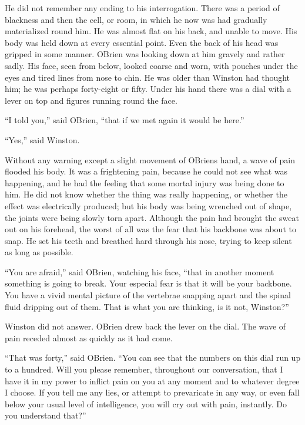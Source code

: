 He did not remember any ending to his interrogation. There was a period
of blackness and then the cell, or room, in which he now was had
gradually materialized round him. He was almost flat on his back, and
unable to move. His body was held down at every essential point. Even
the back of his head was gripped in some manner. O\textquotesingle Brien
was looking down at him gravely and rather sadly. His face, seen from
below, looked coarse and worn, with pouches under the eyes and tired
lines from nose to chin. He was older than Winston had thought him; he
was perhaps forty-eight or fifty. Under his hand there was a dial with a
lever on top and figures running round the face.

``I told you,'' said O\textquotesingle Brien, ``that if we met again it
would be here.''

``Yes,'' said Winston.

Without any warning except a slight movement of
O\textquotesingle Brien\textquotesingle s hand, a wave of pain flooded
his body. It was a frightening pain, because he could not see what was
happening, and he had the feeling that some mortal injury was being done
to him. He did not know whether the thing was really happening, or
whether the effect was electrically produced; but his body was being
wrenched out of shape, the joints were being slowly torn apart. Although
the pain had brought the sweat out on his forehead, the worst of all was
the fear that his backbone was about to snap. He set his teeth and
breathed hard through his nose, trying to keep silent as long as
possible.

``You are afraid,'' said O\textquotesingle Brien, watching his face, ``that
in another moment something is going to break. Your especial fear is
that it will be your backbone. You have a vivid mental picture of the
vertebrae snapping apart and the spinal fluid dripping out of them. That
is what you are thinking, is it not, Winston?''

Winston did not answer. O\textquotesingle Brien drew back the lever on
the dial. The wave of pain receded almost as quickly as it had come.

``That was forty,'' said O\textquotesingle Brien. ``You can see that the
numbers on this dial run up to a hundred. Will you please remember,
throughout our conversation, that I have it in my power to inflict pain
on you at any moment and to whatever degree I choose. If you tell me any
lies, or attempt to prevaricate in any way, or even fall below your
usual level of intelligence, you will cry out with pain, instantly. Do
you understand that?''

